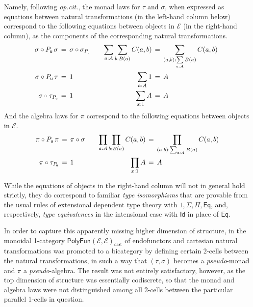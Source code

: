 \documentclass[12pt,reqno]{amsart}
\newcommand{\EE}{\ensuremath{\mathcal{E}}}
\newcommand{\alg}[1]{\ensuremath{\mathsf{#1}}}
\renewcommand{\to}{\ensuremath{\rightarrow}}
\newcommand{\Id}{\mathsf{Id}}
\renewcommand{\t}{\ensuremath{\mathsf{u}}}
\newcommand{\T}{\ensuremath{\mathsf{U}}}
\newcommand{\TT}{\ensuremath{\dot{\mathsf{U}}}}
\theoremstyle{remark}
\theoremstyle{definition}
\begin{document}
Namely, following \emph{op.cit.}, the monad laws for $\tau$ and $\sigma$, when expressed as equations between natural transformations (in the left-hand column below) correspond to the following equations between objects in $\EE$ (in the right-hand column), as the components of the corresponding natural transformations.
\begin{align}\label{typeisos}\textstyle
 \sigma\circ P_\t\, \sigma\, &=\, \sigma\circ\sigma_{P_\t}	&&&	\sum\limits_{a:A}\sum\limits_{b:B(a)}C(a,b)\, &=\, \sum\limits_{(a,b):\sum\limits_{a:A}B(a)}C(a,b)\  \notag\\ 
  \sigma\circ P_\t\,\tau\, &=\, 1 		&&& 	\sum\limits_{a:A}1\, &=\, A  %
  \\ 
  \sigma\circ \tau_{P_\t}\, &=\, 1		&&& 	\sum\limits_{x:1}A\, &=\, A  \notag
 \end{align}
%
And the algebra laws for $\pi$ correspond to the following equations between objects in $\EE$.
%
\begin{align}\label{typeisos2}
 \pi\circ P_\t\,\pi\, &=\,  \pi\circ\sigma 	&&&	\prod\limits_{a:A}\prod\limits_{b:B(a)}C(a,b)\, 
 									&=\, \prod\limits_{(a,b):\sum_{a:A}B(a)}C(a,b)  \notag\\ 
 \pi\circ \tau_{P_\t}\, &=\, 1 	&&& 	\prod\limits_{x:1}A\, &=\, A  %
\end{align}

While the equations of objects in the right-hand column will not in general hold strictly, they do correspond to familiar \emph{type isomorphisms} that are provable from the usual rules of extensional dependent type theory with $1, \Sigma, \Pi, \mathsf{Eq}$, and, respectively, \emph{type equivalences} in the intensional case with $\mathsf{Id}$ in place of $\mathsf{Eq}$. 

In order to capture this apparently missing higher dimension of structure, in \cite{Newstead:thesis, NA:2018} the monoidal 1-category $\mathsf{PolyFun}(\EE, \EE)_{\mathsf{cart}}$ of endofunctors and cartesian natural transformations was promoted to a bicategory by defining certain 2-cells between the natural transformations, in such a way that $(\tau, \sigma)$ becomes a \emph{pseudo}-monad and $\pi$ a \emph{pseudo}-algebra.  The result was not entirely satisfactory, however, as the top dimension of structure was essentially codiscrete, so that the monad and algebra laws were not distinguished among all 2-cells between the particular parallel 1-cells in question.

%
\end{document}
